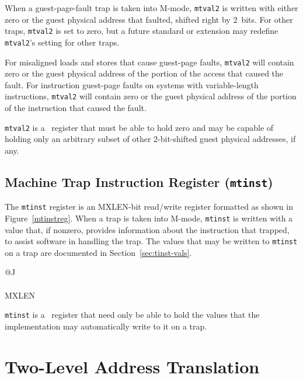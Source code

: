 When a guest-page-fault trap is taken into M-mode, {\tt mtval2} is
written with either zero or the guest physical address that faulted,
shifted right by 2~bits.
For other traps, {\tt mtval2} is set to zero, but a future standard or
extension may redefine {\tt mtval2}'s setting for other traps.

For misaligned loads and stores that cause guest-page faults,
{\tt mtval2} will contain zero or the guest physical address of the
portion of the access that caused the fault.
For instruction guest-page faults on systems with variable-length
instructions, {\tt mtval2} will contain zero or the guest physical
address of the portion of the instruction that caused the fault.

{\tt mtval2} is a \warl\ register that must be able to hold zero and may
be capable of holding only an arbitrary subset of other 2-bit-shifted
guest physical addresses, if any.

\subsection{Machine Trap Instruction Register ({\tt mtinst})}

The {\tt mtinst} register is an MXLEN-bit read/write register formatted
as shown in Figure~\ref{mtinstreg}.
When a trap is taken into M-mode, {\tt mtinst} is written with a value
that, if nonzero, provides information about the instruction that
trapped, to assist software in handling the trap.
The values that may be written to {\tt mtinst} on a trap are documented
in Section~\ref{sec:tinst-vals}.

\begin{figure*}[h!]
{\footnotesize
\begin{center}
\begin{tabular}{@{}J}
 \\
\hline
{} \\
\hline
MXLEN \\
\end{tabular}
\end{center}
}
\vspace{-0.1in}
\caption{Machine trap instruction register ({\tt mtinst}).}
\label{mtinstreg}
\end{figure*}

{\tt mtinst} is a \warl\ register that need only be able to hold the
values that the implementation may automatically write to it on a trap.

\section{Two-Level Address Translation}
\label{sec:two-level-translation}

